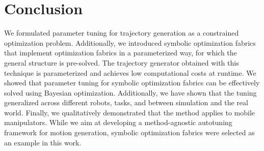 \section{Conclusion}%
\label{sec:icra23_conclusion}
%
We formulated parameter tuning for trajectory generation as a constrained
optimization problem. Additionally, we introduced symbolic optimization fabrics
that implement optimization fabrics in a parameterized way, for which the
general structure is pre-solved. The trajectory generator obtained with this
technique is parameterized and achieves low computational costs at runtime. We
showed that parameter tuning for symbolic optimization fabrics can be
effectively solved using Bayesian optimization. Additionally, we have shown
that the tuning generalized across different robots, tasks, and between
simulation and the real world. Finally, we qualitatively demonstrated that the
method applies to mobile manipulators. 
While we aim at developing a method-agnostic autotuning framework for motion
generation, symbolic optimization fabrics were selected as an example in 
this work.


